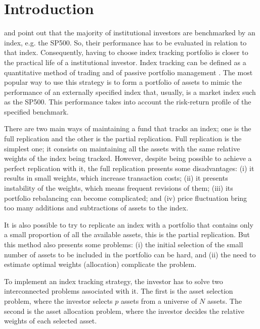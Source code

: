\documentclass[preprint, doubleblind, authoryear,10pt]{elsarticle}
\begin{document}
\section{Introduction} \label{sec:intro}


\cite{tz2011} and \cite{liu-2009} point out that the majority of institutional investors are benchmarked by an index, e.g. the SP500.
So, their performance has to be evaluated in relation to that index.
Consequently, having to choose index tracking portfolio is closer to the practical life of a institutional investor.
Index tracking can be defined as a quantitative method of trading and of passive portfolio management \citep{PLS10, nnl14}.
The most popular way to use this strategy is to form a portfolio of assets to mimic the performance of an externally specified index that, usually, is a market index such as the SP500.
This performance takes into account the risk-return profile of the specified benchmark.

There are two main ways of maintaining a fund that tracks an index; one is the full replication and the other is the partial replication.
Full replication is the simplest one; it consists on maintaining all the assets with the same relative weights of the index being tracked.
However, despite being possible to achieve a perfect replication with it, the full replication presents some disadvantages:
(i) it results in small weights, which increase transaction costs;
(ii) it presents instability of the weights, which means frequent revisions of them;
(iii) its portfolio rebalancing can become complicated; 
and (iv) price fluctuation bring too many additions and subtractions of assets to the index.

It is also possible to try to replicate an index with a portfolio that contains only a small proportion of all the available assets, this is the partial replication.
But this method also presents some problems:
(i) the initial selection of the small number of assets to be included in the portfolio can be hard, and
(ii) the need to estimate optimal weights (allocation) complicate the problem.

To implement an index tracking strategy, the investor has to solve two interconnected problems associated with it.
The first is the asset selection problem, where the investor selects $p$ assets from a universe of $N$ assets.
The second is the asset allocation problem, where the investor decides the relative weights of each selected asset.
\end{document}
